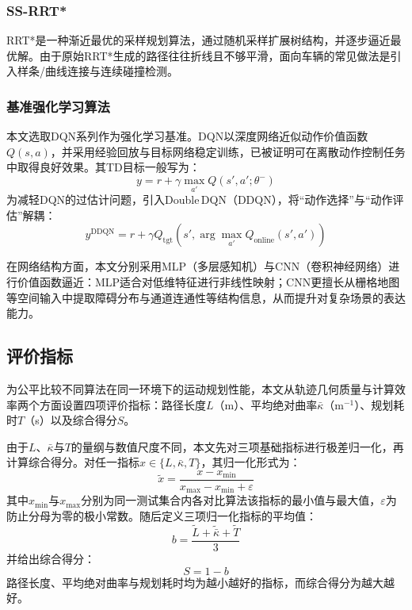 \documentclass{iopjournal}
\begin{document}
\subsubsection{SS-RRT*}

RRT*是一种渐近最优的采样规划算法，通过随机采样扩展树结构，并逐步逼近最优解。由于原始RRT*生成的路径往往折线且不够平滑，面向车辆的常见做法是引入样条/曲线连接与连续碰撞检测。

\subsubsection{基准强化学习算法}

本文选取DQN系列作为强化学习基准。DQN以深度网络近似动作价值函数$Q(s,a)$，并采用经验回放与目标网络稳定训练，已被证明可在离散动作控制任务中取得良好效果。其TD目标一般写为：
\begin{equation}
  y = r + \gamma\max_{a'} Q(s', a'; \theta^-)
\end{equation}
为减轻DQN的过估计问题，引入Double\,DQN（DDQN），将``动作选择''与``动作评估''解耦：
\begin{equation}
  y^{\text{DDQN}} = r + \gamma Q_{\text{tgt}}\!\left(s', \arg\max_{a'} Q_{\text{online}}(s', a')\right)
\end{equation}

在网络结构方面，本文分别采用MLP（多层感知机）与CNN（卷积神经网络）进行价值函数逼近：MLP适合对低维特征进行非线性映射；CNN更擅长从栅格地图等空间输入中提取障碍分布与通道连通性等结构信息，从而提升对复杂场景的表达能力。

\subsection{评价指标}

为公平比较不同算法在同一环境下的运动规划性能，本文从轨迹几何质量与计算效率两个方面设置四项评价指标：路径长度$L$（m）、平均绝对曲率$\bar{\kappa}$（m$^{-1}$）、规划耗时$T$（s）以及综合得分$S$。

由于$L$、$\bar{\kappa}$与$T$的量纲与数值尺度不同，本文先对三项基础指标进行极差归一化，再计算综合得分。对任一指标$x \in \{L, \bar{\kappa}, T\}$，其归一化形式为：
\begin{equation}
  \tilde{x} = \frac{x - x_{\min}}{x_{\max} - x_{\min} + \varepsilon}
\end{equation}
其中$x_{\min}$与$x_{\max}$分别为同一测试集合内各对比算法该指标的最小值与最大值，$\varepsilon$为防止分母为零的极小常数。随后定义三项归一化指标的平均值：
\begin{equation}
  b = \frac{\tilde{L} + \tilde{\bar{\kappa}} + \tilde{T}}{3}
\end{equation}
并给出综合得分：
\begin{equation}
  S = 1 - b
\end{equation}
路径长度、平均绝对曲率与规划耗时均为越小越好的指标，而综合得分为越大越好。
\end{document}
